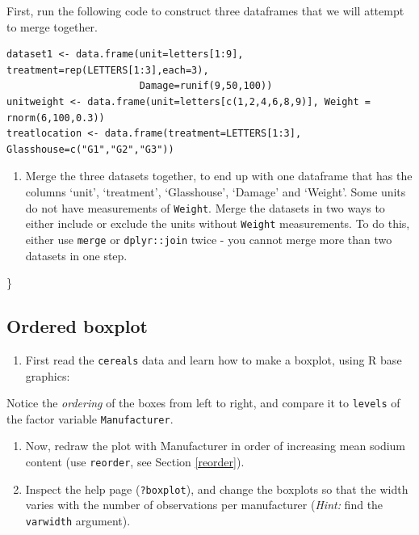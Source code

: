 \documentclass[]{book}
\providecommand{\tightlist}{%
  \setlength{\itemsep}{0pt}\setlength{\parskip}{0pt}}
\begin{document}
First, run the following code to construct three dataframes that we will attempt to merge together.

\begin{verbatim}
dataset1 <- data.frame(unit=letters[1:9], treatment=rep(LETTERS[1:3],each=3),
                       Damage=runif(9,50,100))
unitweight <- data.frame(unit=letters[c(1,2,4,6,8,9)], Weight = rnorm(6,100,0.3))
treatlocation <- data.frame(treatment=LETTERS[1:3], Glasshouse=c("G1","G2","G3"))
\end{verbatim}

\begin{enumerate}
\def\labelenumi{\arabic{enumi}.}
\tightlist
\item
  Merge the three datasets together, to end up with one dataframe that has the columns `unit', `treatment', `Glasshouse', `Damage' and `Weight'. Some units do not have measurements of \texttt{Weight}. Merge the datasets in two ways to either include or exclude the units without \texttt{Weight} measurements. To do this, either use \texttt{merge} or \texttt{dplyr::join} twice - you cannot merge more than two datasets in one step.
\end{enumerate}

\}

\hypertarget{ordered-boxplot}{%
\subsection{Ordered boxplot}\label{ordered-boxplot}}

\begin{enumerate}
\def\labelenumi{\arabic{enumi}.}
\tightlist
\item
  First read the \texttt{cereals} data and learn how to make a boxplot, using R base graphics:
\end{enumerate}

Notice the \emph{ordering} of the boxes from left to right, and compare it to \texttt{levels} of the factor variable \texttt{Manufacturer}.

\begin{enumerate}
\def\labelenumi{\arabic{enumi}.}
\setcounter{enumi}{1}
\item
  Now, redraw the plot with Manufacturer in order of increasing mean sodium content (use \texttt{reorder}, see Section \ref{reorder}).
\item
  Inspect the help page (\texttt{?boxplot}), and change the boxplots so that the width varies with the number of observations per manufacturer (\emph{Hint:} find the \texttt{varwidth} argument).
\end{enumerate}
\end{document}
